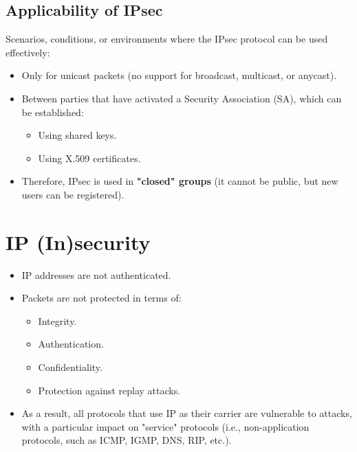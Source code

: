 \subsection{Applicability of IPsec}
Scenarios, conditions, or environments where the IPsec protocol can be used effectively:
\begin{itemize}
    \item Only for unicast packets (no support for broadcast, multicast, or anycast).
    \item Between parties that have activated a Security Association (SA), which can be established:
    \begin{itemize}
        \item Using shared keys.
        \item Using X.509 certificates.
    \end{itemize}
    \item Therefore, IPsec is used in \textbf{"closed" groups} (it cannot be public, but new users can be registered).
\end{itemize}

\section{IP (In)security}
\begin{itemize}
    \item IP addresses are not authenticated.
    \item Packets are not protected in terms of:
    \begin{itemize}
        \item Integrity.
        \item Authentication.
        \item Confidentiality.
        \item Protection against replay attacks.
    \end{itemize}
    \item As a result, all protocols that use IP as their carrier are vulnerable to attacks, with a particular impact on "service" protocols (i.e., non-application protocols, such as ICMP, IGMP, DNS, RIP, etc.).
\end{itemize}

